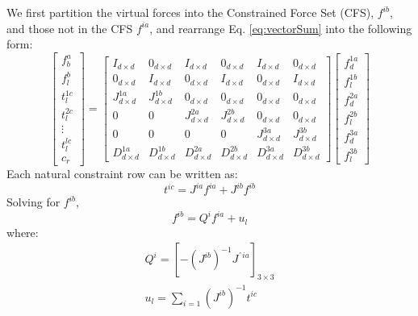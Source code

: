 \documentclass[]{article}
\begin{document}
We first partition the virtual forces into the Constrained Force Set (CFS), $f^{ib}$, and those not in
the CFS $f^{ia}$, and rearrange Eq. \ref{eq:vectorSum} into the following form:
\begin{equation}
\begin{bmatrix}
f_b^a		\\
f_l^b		\\
t_l^{1c}	\\
t_l^{2c}	\\
\vdots		\\
t_l^{lc}	\\
c_r
\end{bmatrix}
=
\begin{bmatrix}
	I_{d\times d}		&0_{d\times d}		&I_{d\times d}		&0_{d\times d}		&I_{d\times d}		&0_{d\times d} 	\\ 
	0_{d\times d}		&I_{d\times d}		&0_{d\times d} 		&I_{d\times d}		&0_{d\times d}		&I_{d\times d} 	\\ 
	J^{1a}_{d\times d}	&J^{1b}_{d\times d}	&0_{d\times d} 		&0_{d\times d}		&0_{d\times d}		&0_{d\times d} 	\\
	0					&0					&J^{2a}_{d\times d}	&J^{2b}_{d\times d}	&0_{d\times d}		&0_{d\times d}	\\ 
	0					&0					&0					&0					&J^{3a}_{d\times d}	&J^{3b}_{d\times d}\\ 
	D^{1a}_{d\times d}	&D^{1b}_{d\times d}	&D^{2a}_{d\times d}	&D^{2b}_{d\times d}	&D^{3a}_{d\times d}	&D^{3b}_{d\times d}	
\end{bmatrix}
\begin{bmatrix}
f_d^{1a} 	\\
f_l^{1b} 	\\
f_d^{2a}	\\
f_l^{2b}	\\
f_d^{3a} 	\\
f_l^{3b} 	
\end{bmatrix}
\label{eq:parallelVirtualModelEquation}
\end{equation}
Each natural constraint row can be written as:
\begin{equation}
t^{ic}=J^{ia}f^{ia}+J^{ib}f^{ib}	
\end{equation}
Solving for $f^{ib}$,
\begin{equation}
	\label{eq:fib}	
	f^{ib}=Q^if^{ia}+u_l
\end{equation}
where:
\begin{eqnarray}
Q^i=[-(J^{ib})^{-1}J^{ˆia}]_{3\times3}	\\	
u_l=\sum_{i=1}(J^{ib})^{-1}t^{ic}			
\end{eqnarray}
\end{document}
